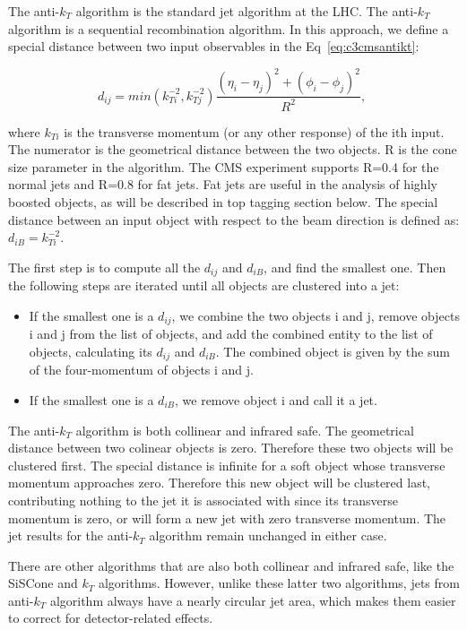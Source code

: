 The anti-$k_{T}$ algorithm\cite{Cacciari:2008gp} is the standard jet algorithm at the LHC. The anti-$k_{T}$ algorithm is a sequential recombination algorithm. In this approach, we define a special distance between two input observables in the Eq~\ref{eq:c3cmsantikt}:

\begin{equation}
 d_{ij} = min(k_{Ti}^{-2},k_{Tj}^{-2})\frac{(\eta_{i}-\eta_{j})^{2}+(\phi_{i}-\phi_{j})^{2}}{R^{2}}, \;
 \label{eq:c3cmsantikt}
\end{equation}

where $k_{Ti}$ is the transverse momentum (or any other response) of the ith input. The numerator is the geometrical distance between the two objects. R is the cone size parameter in the algorithm. The CMS experiment supports R=0.4 for the normal jets and R=0.8 for fat jets. Fat jets are useful in the analysis of highly boosted objects, as will be described in top tagging section below. The special distance between an input object with respect to the beam direction is defined as: $d_{iB} = k_{Ti}^{-2}$.

The first step is to compute all the $d_{ij}$ and $d_{iB}$, and find the smallest one. Then the following steps are iterated until all objects are clustered into a jet: 

\begin{itemize}
  \item If the smallest one is a $d_{ij}$, we combine the two objects i and j, remove objects i and j from the list of objects, and add the combined entity to the list of objects, calculating its $d_{ij}$ and $d_{iB}$. The combined object is given by the sum of the four-momentum of objects i and j.
  \item If the smallest one is a $d_{iB}$, we remove object i and call it a jet.
\end{itemize}

The anti-$k_{T}$ algorithm is both collinear and infrared safe. The geometrical distance between two colinear objects is zero. Therefore these two objects will be clustered first. The special distance is infinite for a soft object whose transverse momentum approaches zero. Therefore this new object will be clustered last, contributing nothing to the jet it is associated with since its transverse momentum is zero, or will form a new jet with zero transverse momentum. The jet results for the anti-$k_{T}$ algorithm remain unchanged in either case. 

There are other algorithms that are also both collinear and infrared safe, like the SiSCone\cite{Salam:2007xv} and $k_{T}$\cite{Cacciari:2005hq} algorithms. However, unlike these latter two algorithms, jets from anti-$k_{T}$ algorithm always have a nearly circular jet area\cite{Cacciari:2008gn}, which makes them easier to correct for detector-related effects.

